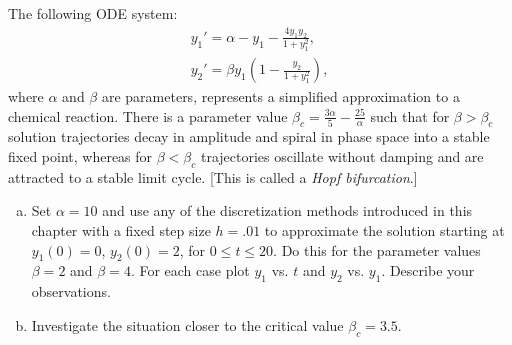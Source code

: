 \begin{problem}[A\&P 3.3]
  The following ODE system:
  \begin{align*}
    y_1' = \alpha - y_1 - \frac{4y_1 y_2}{1 + y_1^2}, \\
    y_2' = \beta y_1 \left(1 - \frac{y_2}{1 + y_1^2}\right),
  \end{align*}
  where $\alpha$ and $\beta$ are parameters, represents a simplified approximation to a chemical reaction. There is a parameter value $\beta_c = \frac{3\alpha}{5} - \frac{25}{\alpha}$ such that for $\beta > \beta_c$ solution trajectories decay in amplitude and spiral in phase space into a stable fixed point, whereas for $\beta < \beta_c$ trajectories oscillate without damping and are attracted to a stable limit cycle. [This is called a \emph{Hopf bifurcation}.]
  \begin{enumerate}[(a)]
    \item Set $\alpha = 10$ and use any of the discretization methods introduced in this chapter with a fixed step size $h = .01$ to approximate the solution starting at $y_1(0) = 0$, $y_2(0) = 2$, for $0 \leq t \leq 20$. Do this for the parameter values $\beta = 2$ and $\beta = 4$. For each case plot $y_1$ vs. $t$ and $y_2$ vs. $y_1$. Describe your observations.
    \item Investigate the situation closer to the critical value $\beta_c = 3.5$.
  \end{enumerate}
\end{problem}
